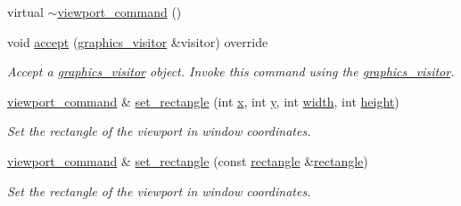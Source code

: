 \begin{DoxyCompactItemize}
\item 
virtual \mbox{\hyperlink{classmoka_1_1viewport__command_aed04702ad92d74fbf111babf9d68076d}{$\sim$viewport\+\_\+command}} ()
\item 
void \mbox{\hyperlink{classmoka_1_1viewport__command_a8344d1f3a278d8fe04f1f6c86d0877c1}{accept}} (\mbox{\hyperlink{classmoka_1_1graphics__visitor}{graphics\+\_\+visitor}} \&visitor) override
\begin{DoxyCompactList}\small\item\em Accept a \mbox{\hyperlink{classmoka_1_1graphics__visitor}{graphics\+\_\+visitor}} object. Invoke this command using the \mbox{\hyperlink{classmoka_1_1graphics__visitor}{graphics\+\_\+visitor}}. \end{DoxyCompactList}\item 
\mbox{\hyperlink{classmoka_1_1viewport__command}{viewport\+\_\+command}} \& \mbox{\hyperlink{classmoka_1_1viewport__command_a48ee8475ca7476660ded9ddd54245581}{set\+\_\+rectangle}} (int \mbox{\hyperlink{classmoka_1_1viewport__command_a969e11499ed8e5bf1a389ec4c6bd7a4f}{x}}, int \mbox{\hyperlink{classmoka_1_1viewport__command_a7141660e90f1abb2f3ce40c9d42d91f2}{y}}, int \mbox{\hyperlink{classmoka_1_1viewport__command_a784e567b923e2fccf12dddc4739bb931}{width}}, int \mbox{\hyperlink{classmoka_1_1viewport__command_ab64f17e585f3dbab2e45959cde1c429e}{height}})
\begin{DoxyCompactList}\small\item\em Set the rectangle of the viewport in window coordinates. \end{DoxyCompactList}\item 
\mbox{\hyperlink{classmoka_1_1viewport__command}{viewport\+\_\+command}} \& \mbox{\hyperlink{classmoka_1_1viewport__command_aa2f934c8721d015630be80728feed6f3}{set\+\_\+rectangle}} (const \mbox{\hyperlink{namespacemoka_ab5e90635f0a0441cc99f2328bc34500d}{rectangle}} \&\mbox{\hyperlink{namespacemoka_ab5e90635f0a0441cc99f2328bc34500d}{rectangle}})
\begin{DoxyCompactList}\small\item\em Set the rectangle of the viewport in window coordinates. \end{DoxyCompactList}\end{DoxyCompactItemize}
